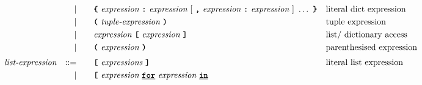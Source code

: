 \begin{alignat*}{9}
&&                       && |   &\quad &&   \textbf{\texttt{\{}} \ \textit{expression} \ \textbf{\texttt{:}} \ 
                                            \textit{expression} \  [\ \textbf{\texttt{,}} \ 
                                            \textit{expression} \ \textbf{\texttt{:}} \ 
                                            \textit{expression} \ ]\ \ldots \ \textbf{\texttt{\}}}
                                            && \textrm{literal dict expression}\\
&&                       && |   &\quad &&   \textbf{\texttt{(}}\  \textit{tuple-expression} \ \textbf{\texttt{)}}
                                                           && \textrm{tuple expression}\\
&&                       && |   &\quad &&   \textit{expression} \ 
                                            \textbf{\texttt{[}}\ \textit{expression}\
                                            \textbf{\texttt{]}} && \textrm{list/ dictionary access}\\
&&                       && |   &\quad &&  \textbf{\texttt{(}}\  \textit{expression} \ 
                                            \textbf{\texttt{)}} && \textrm{parenthesised expression}\\[1mm]
&& \textit{list-expression}   && ::= &\quad &&   \textbf{\texttt{[}}\ \textit{expressions}\
                                            \textbf{\texttt{]}}
                                                           && \textrm{literal list expression}\\
&&                       && |   &\quad &&   \textbf{\texttt{[}}\ \textit{expression} \     \textbf{\texttt{\underline{for}}} \ \textit{expression} \ \textbf{\texttt{\underline{in}}} \

\end{alignat*}
